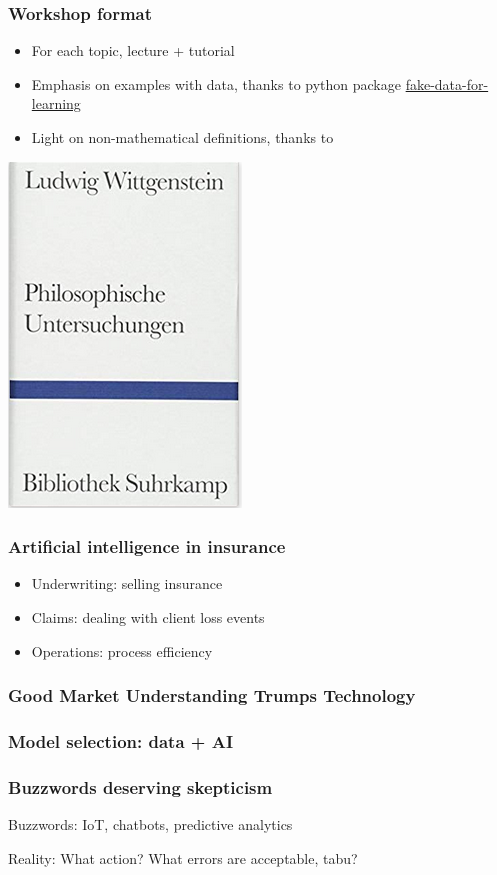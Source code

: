 \begin{frame}
\frametitle{Workshop format}

\begin{itemize}
\item For each topic, lecture + tutorial
\item Emphasis on examples with data, thanks to python package \href{https://github.com/munichpavel/fake-data-for-learning}{fake-data-for-learning}
\item Light on non-mathematical definitions, thanks to 
\end{itemize}
\centering
\includegraphics[width=0.3\textheight]{figures/pi_wittgenstein}
\end{frame}

\begin{frame}
  \frametitle{Artificial intelligence in insurance}

  \begin{itemize}
    \item Underwriting: selling insurance
    \item Claims: dealing with client loss events
    \item Operations: process efficiency
  \end{itemize}
\end{frame}

\begin{frame}
\frametitle{Good Market Understanding Trumps Technology}
\centering
{}
\end{frame}

\begin{frame}
  \frametitle{Model selection: data + AI}
\end{frame}
\begin{frame}
\frametitle{Buzzwords deserving skepticism}
Buzzwords: IoT, chatbots, predictive analytics

Reality: What action? What errors are acceptable, tabu?
\end{frame}




